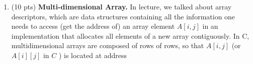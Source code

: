 \documentclass[10pt]{article}
\newcommand{\infertext}[2]{\infer{{\textrm{#1}}}{#2}}
\begin{document}
\begin{enumerate}
\begin{enumerate}
                    \begin{enumerate}
                        \item (2 pts) \textsf{new Array[A][e]}
                              \textcolor{blue}{
                                  \[\infertext
                                      {$O,M,C$ $\vdash$ $new\ Array[A][e]$ : $Array(A)$ }
                                      {
                                          \textrm{$O,M,C$ $\vdash$ $e$ : $Int$}
                                      }
                                  \]
                              }
                        \item (2 pts) \textsf{e1[e2]}
                              \textcolor{blue}{
                                  \[\infertext
                                      {$O,M,C$ $\vdash$ $\ e1[e2]$ : $T$ }
                                      {
                                          \textrm{$O,M,C$ $\vdash$ $e1$ : $Array(T)$}
                                          \ \ \ \ \textrm{$O,M,C$ $\vdash$ $e2$ : $Int$}
                                      }
                                  \]
                              }
                        \item (4 pts) \textsf{e1[e2] $<$- e3}. Assume the type of the whole expression is the type of \textsf{e1}.
                              \textcolor{blue}{
                                  \[\infertext
                                      {$O,M,C$ $\vdash$ $\ e1[e2] \leftarrow e3 $ : $Array(T)$ }
                                      {
                                          \textrm{$O,M,C$ $\vdash$ $e1$ : $Array(T)$}
                                          \ \ \ \ \textrm{$O,M,C$ $\vdash$ $e2$ : $Int$}
                                          \ \ \ \ \textrm{$O,M,C$ $\vdash$ $e3$ : $T'$}
                                          \ \ \ \ \textrm{$T'\leq T$}
                                      }
                                  \]
                              }
                    \end{enumerate}
          \end{enumerate}
    \item (10 pts) \textbf{Multi-dimensional Array.} In lecture, we talked about array descriptors, which are data
          structures containing all the information one needs to access (get the address of) an array element $A[i, j]$ in
          an implementation that allocates all elements of a new array contiguously. In $\mathrm{C}$, multidimensional
          arrays are composed of rows of rows, so that $A[i, j]$ (or $A[i][j]$ in $C$ ) is located at address

\end{enumerate}
\end{document}

